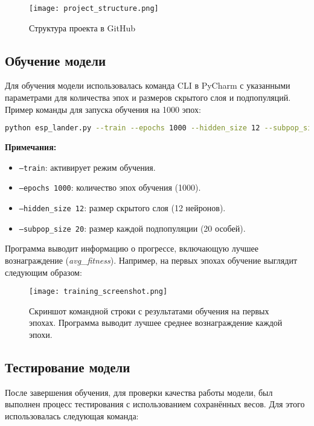\documentclass[a4paper,12pt]{article}
\begin{document}
\begin{figure}[H]
	\centering
	\texttt{[image: project\_structure.png]}
	\caption{Структура проекта в GitHub}
	\label{fig:project_structure}
\end{figure}

\subsection{Обучение модели}

Для обучения модели использовалась команда CLI в PyCharm с указанными параметрами для количества эпох и размеров скрытого слоя и подпопуляций. Пример команды для запуска обучения на 1000 эпох:

\begin{lstlisting}[language=bash]
	python esp_lander.py --train --epochs 1000 --hidden_size 12 --subpop_size 20
\end{lstlisting}

\textbf{Примечания:}
\begin{itemize}
	\item \texttt{--train}: активирует режим обучения.
	\item \texttt{--epochs 1000}: количество эпох обучения (1000).
	\item \texttt{--hidden\_size 12}: размер скрытого слоя (12 нейронов).
	\item \texttt{--subpop\_size 20}: размер каждой подпопуляции (20 особей).
\end{itemize}

Программа выводит информацию о прогрессе, включающую лучшее вознаграждение (\textit{avg\_fitness}). Например, на первых эпохах обучение выглядит следующим образом:

\begin{figure}[H]
	\centering
	\texttt{[image: training\_screenshot.png]}
	\caption{Скриншот командной строки с результатами обучения на первых эпохах. Программа выводит лучшее среднее вознаграждение каждой эпохи.}
	\label{fig:training_screenshot}
\end{figure}

\subsection{Тестирование модели}

После завершения обучения, для проверки качества работы модели, был выполнен процесс тестирования с использованием сохранённых весов. Для этого использовалась следующая команда:
\end{document}
